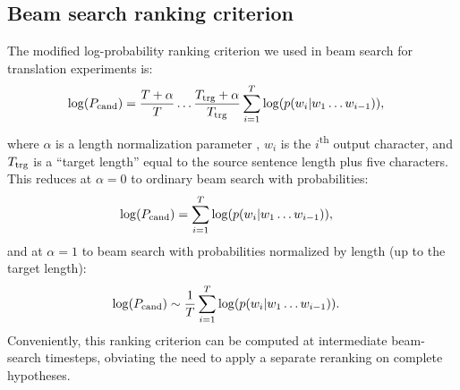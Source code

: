 \documentclass{article} %
\begin{document}
\subsection*{Beam search ranking criterion}
The modified log-probability ranking criterion we used in beam search for translation experiments is:
\begin{align}
\begin{split}\label{length-bonus}
\log(P_{\rm cand})&=\frac{T+\alpha}{T}\hdots\frac{T_{\rm trg}+\alpha}{T_{\rm trg}}\sum_{i=1}^T \log(p(w_i|w_1\hdots w_{i-1})),
\end{split}
\end{align}
where $\alpha$ is a length normalization parameter \citep{Wu2016}, $w_i$ is the $i$\textsuperscript{th} output character, and $T_{\rm trg}$ is a ``target length'' equal to the source sentence length plus five characters. This reduces at $\alpha=0$ to ordinary beam search with probabilities:
\begin{align}
\begin{split}\label{alpha-zero}
\log(P_{\rm cand})&=\sum_{i=1}^T \log(p(w_i|w_1\hdots w_{i-1})),
\end{split}
\end{align}
and at $\alpha=1$ to beam search with probabilities normalized by length (up to the target length): 
\begin{align}
\begin{split}\label{alpha-one}
\log(P_{\rm cand})&\sim \frac{1}{T}\sum_{i=1}^T \log(p(w_i|w_1\hdots w_{i-1})).
\end{split}
\end{align}
Conveniently, this ranking criterion can be computed at intermediate beam-search timesteps, obviating the need to apply a separate reranking on complete hypotheses.
\end{document}
